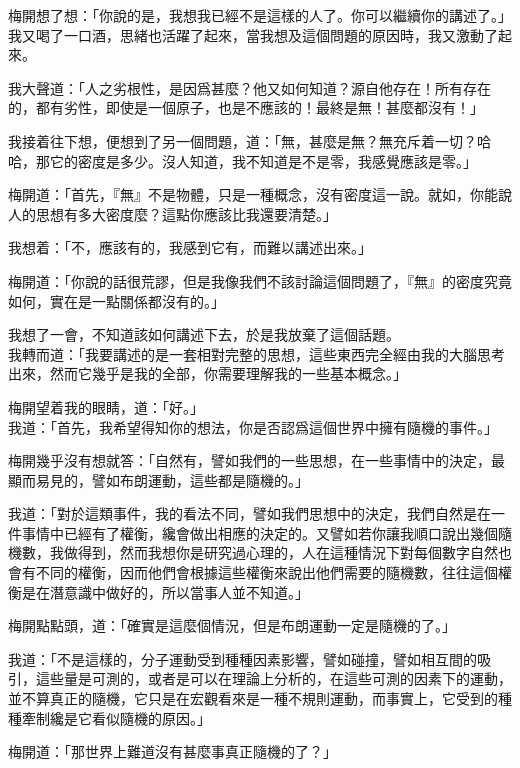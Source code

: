 梅開想了想：「你說的是，我想我已經不是這樣的人了。你可以繼續你的講述了。」
\\


我又喝了一口酒，思緒也活躍了起來，當我想及這個問題的原因時，我又激動了起來。

我大聲道：「人之劣根性，是因爲甚麼？他又如何知道？源自他存在！所有存在的，都有劣性，即使是一個原子，也是不應該的！最終是無！甚麼都沒有！」

我接着往下想，便想到了另一個問題，道：「無，甚麼是無？無充斥着一切？哈哈，那它的密度是多少。沒人知道，我不知道是不是零，我感覺應該是零。」

梅開道：「首先，『無』不是物體，只是一種概念，沒有密度這一說。就如，你能說人的思想有多大密度麼？這點你應該比我還要清楚。」

我想着：「不，應該有的，我感到它有，而難以講述出來。」

梅開道：「你說的話很荒謬，但是我像我們不該討論這個問題了，『無』的密度究竟如何，實在是一點關係都沒有的。」

我想了一會，不知道該如何講述下去，於是我放棄了這個話題。
\\


我轉而道：「我要講述的是一套相對完整的思想，這些東西完全經由我的大腦思考出來，然而它幾乎是我的全部，你需要理解我的一些基本概念。」

梅開望着我的眼睛，道：「好。」
\\


我道：「首先，我希望得知你的想法，你是否認爲這個世界中擁有隨機的事件。」

梅開幾乎沒有想就答：「自然有，譬如我們的一些思想，在一些事情中的決定，最顯而易見的，譬如布朗運動，這些都是隨機的。」

我道：「對於這類事件，我的看法不同，譬如我們思想中的決定，我們自然是在一件事情中已經有了權衡，纔會做出相應的決定的。又譬如若你讓我順口說出幾個隨機數，我做得到，然而我想你是研究過心理的，人在這種情況下對每個數字自然也會有不同的權衡，因而他們會根據這些權衡來說出他們需要的隨機數，往往這個權衡是在潛意識中做好的，所以當事人並不知道。」

梅開點點頭，道：「確實是這麼個情況，但是布朗運動一定是隨機的了。」

我道：「不是這樣的，分子運動受到種種因素影響，譬如碰撞，譬如相互間的吸引，這些量是可測的，或者是可以在理論上分析的，在這些可測的因素下的運動，並不算真正的隨機，它只是在宏觀看來是一種不規則運動，而事實上，它受到的種種牽制纔是它看似隨機的原因。」

梅開道：「那世界上難道沒有甚麼事真正隨機的了？」

